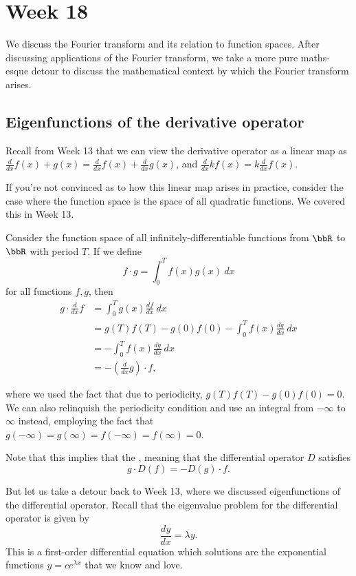 \documentclass[a4paper, 12pt,oneside,openany]{book}
\begin{document}
\chapter{Week 18}

We discuss the Fourier transform and its relation to function spaces. After discussing applications of the Fourier transform, we take a more pure maths-esque detour to discuss the mathematical context by which the Fourier transform arises.

\section{Eigenfunctions of the derivative operator}

Recall from Week 13 that we can view the derivative operator as a linear map as $\frac{d}{dx} f(x)+g(x) = \frac{d}{dx} f(x) + \frac{d}{dx} g(x)$, and $\frac{d}{dx} kf(x) = k\frac{d}{dx} f(x).$ 

If you're not convinced as to how this linear map arises in practice, consider the case where the function space is the space of all quadratic functions. We covered this in Week 13. 

Consider the function space of all infinitely-differentiable functions from $\bbR$ to $\bbR$ with period $T$. If we define $$f \cdot g = \int_0^T f(x)g(x)\ dx$$ for all functions $f, g$, then \begin{align*} g \cdot \frac{d}{dx} f &= \int_0^T g(x) \frac{df}{dx} \ dx \\ &= g(T)f(T)-g(0)f(0) - \int_0^T f(x) \frac{dg}{dx}\ dx \\ &=- \int_0^T f(x) \frac{dg}{dx}\ dx \\ &= -(\frac{d}{dx}g) \cdot f, \end{align*}

where we used the fact that due to periodicity, $g(T)f(T)-g(0)f(0)=0$. We can also relinquish the periodicity condition and use an integral from $-\infty$ to $\infty$ instead, employing the fact that $g(-\infty)=g(\infty)=f(-\infty)=f(\infty)=0$. 

Note that this implies that the , meaning that the differential operator $D$ satisfies $$g \cdot D(f)  = -D(g) \cdot f.$$

But let us take a detour back to Week 13, where we discussed eigenfunctions of the differential operator. Recall that the eigenvalue problem for the differential operator is given by $$\frac{dy}{dx} = \lambda y.$$ This is a first-order differential equation which solutions are the exponential functions $y=ce^{\lambda x}$ that we know and love. 
\end{document}
